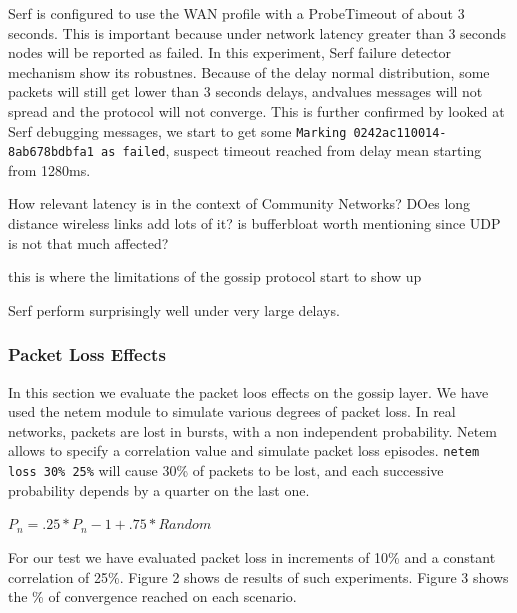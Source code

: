 \documentclass{sig-alternate}
\begin{document}
Serf is configured to use the WAN profile with a ProbeTimeout of about 3 seconds. This is important because under network latency greater than 3 seconds nodes will be reported as failed. In this experiment, Serf failure detector mechanism show its robustnes. Because of the delay normal distribution, some packets will still get lower than 3 seconds delays, andvalues messages will not spread and the protocol will not converge. This is further confirmed by looked at Serf debugging messages, we start to get some \texttt{Marking 0242ac110014-8ab678bdbfa1 as failed}, suspect timeout reached from delay mean starting from 1280ms.

How relevant latency is in the context of Community Networks? DOes long distance wireless links add lots of it? is bufferbloat worth mentioning since UDP is not that much affected?

this is where the limitations of the gossip protocol start to show up

Serf perform surprisingly well under very large delays.



\subsubsection{Packet Loss Effects}

In this section we evaluate the packet loos effects on the gossip layer. We have used the netem module to simulate various degrees of packet loss. In real networks, packets are lost in bursts, with a non independent probability. Netem allows to specify a correlation value and simulate packet loss episodes. \texttt{netem loss 30\% 25\%} will cause 30\% of packets to be lost, and each successive probability depends by a quarter on the last one.

$P_n = .25 * P_n-1 + .75 * Random$

For our test we have evaluated packet loss in increments of 10\% and a constant correlation of 25\%. Figure 2 shows de results of such experiments. Figure 3 shows the \% of convergence reached on each scenario.
\end{document}
